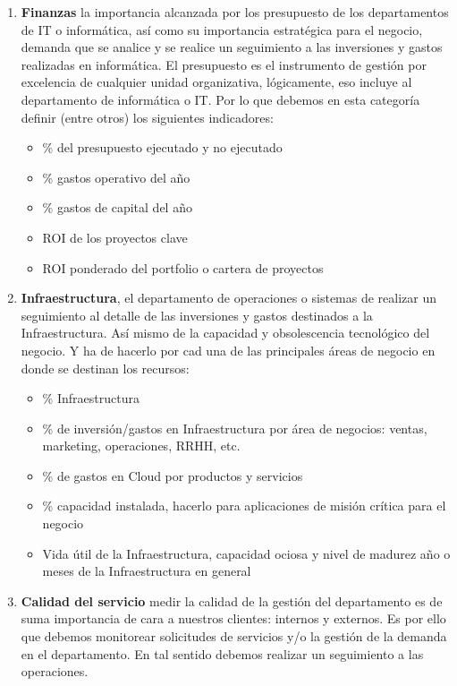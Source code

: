 \documentclass[12pt]{article}
\begin{document}
\begin{enumerate}
  \item \textbf{Finanzas} la importancia alcanzada por los presupuesto de los departamentos de IT o informática, así como su importancia estratégica para el negocio, demanda que se analice y se realice un seguimiento a las inversiones y gastos realizadas en informática. El presupuesto es el instrumento de gestión por excelencia de cualquier unidad organizativa, lógicamente, eso incluye al departamento de informática o IT. Por lo que debemos en esta categoría definir (entre otros) los siguientes indicadores:
  \begin{itemize}
    \item \% del presupuesto ejecutado y no ejecutado
    \item \% gastos operativo del año
    \item \% gastos de capital del año
    \item ROI de los proyectos clave
    \item ROI ponderado del portfolio o cartera de proyectos
  \end{itemize}

  \item \textbf{Infraestructura}, el departamento de operaciones o sistemas de realizar un seguimiento al detalle de las inversiones y gastos destinados a la Infraestructura. Así mismo de la capacidad y obsolescencia tecnológico del negocio. Y ha de hacerlo por cad una de las principales áreas de negocio en donde se destinan los recursos:
  \begin{itemize}
    \item \% Infraestructura
    \item \% de inversión/gastos en Infraestructura por área de negocios: ventas, marketing, operaciones, RRHH, etc.
    \item \% de gastos en Cloud por productos y servicios
    \item \% capacidad instalada, hacerlo para aplicaciones de misión crítica para el negocio
    \item Vida útil de la Infraestructura, capacidad ociosa y nivel de madurez año o meses de la Infraestructura en general
  \end{itemize}

  \item \textbf{Calidad del servicio} medir la calidad de la gestión del departamento es de suma importancia de cara a nuestros clientes: internos y externos. Es por ello que debemos monitorear solicitudes de servicios y/o la gestión de la demanda en el departamento. En tal sentido debemos realizar un seguimiento a las operaciones.


\end{enumerate}
\end{document}
